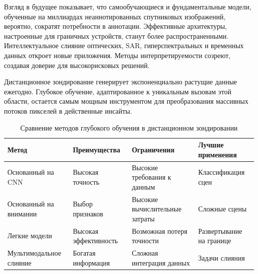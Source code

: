 \documentclass[12pt,a4paper]{article}
\begin{document}
Взгляд в будущее показывает, что самообучающиеся и фундаментальные модели, обученные на миллиардах неаннотированных спутниковых изображений, вероятно, сократят потребности в аннотации. Эффективные архитектуры, настроенные для граничных устройств, станут более распространенными. Интеллектуальное слияние оптических, SAR, гиперспектральных и временных данных откроет новые приложения. Методы интерпретируемости созреют, создавая доверие для высокорисковых решений.

Дистанционное зондирование генерирует экспоненциально растущие данные ежегодно. Глубокое обучение, адаптированное к уникальным вызовам этой области, остается самым мощным инструментом для преобразования массивных потоков пикселей в действенные инсайты.

\begin{table}[htbp]
\centering
\caption{Сравнение методов глубокого обучения в дистанционном зондировании}
\label{tab:comparison}
\begin{tabular}{@{}llll@{}}
\toprule
\textbf{Метод} & \textbf{Преимущества} & \textbf{Ограничения} & \textbf{Лучшие применения} \\
\midrule
Основанный на CNN & Высокая точность & Высокие требования к данным & Классификация сцен \\
Основанный на внимании & Выбор признаков & Высокие вычислительные затраты & Сложные сцены \\
Легкие модели & Высокая эффективность & Возможная потеря точности & Развертывание на границе \\
Мультимодальное слияние & Богатая информация & Сложная интеграция данных & Задачи слияния \\
\bottomrule
\end{tabular}
\end{table}
\end{document}
